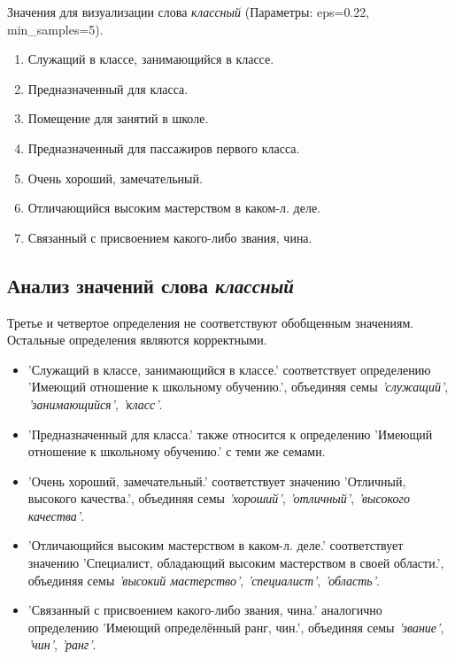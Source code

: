 Значения для визуализации слова \textit{классный} (Параметры: eps=0.22, min\_samples=5).

\begin{enumerate}
    \item Служащий в классе, занимающийся в классе.
    \item Предназначенный для класса.
    \item Помещение для занятий в школе.
    \item Предназначенный для пассажиров первого класса.
    \item Очень хороший, замечательный.
    \item Отличающийся высоким мастерством в каком-л. деле.
    \item Связанный с присвоением какого-либо звания, чина.
\end{enumerate}

\subsection*{Анализ значений слова \textit{классный}}

Третье и четвертое определения не соответствуют обобщенным значениям.
Остальные определения являются корректными.

\begin{itemize}
    \item ’Служащий в классе, занимающийся в классе.’ соответствует определению
’Имеющий отношение к школьному обучению.’, объединяя семы \textit{’служащий’}, \textit{’занимающийся’}, \textit{’класс’}.

    \item ’Предназначенный для класса.’ также относится к определению
’Имеющий отношение к школьному обучению.’ с теми же семами.

    \item ’Очень хороший, замечательный.’ соответствует значению ’Отличный, высокого качества.’,
объединяя семы \textit{’хороший’}, \textit{’отличный’}, \textit{’высокого качества’}.

    \item ’Отличающийся высоким мастерством в каком-л. деле.’ соответствует значению
’Специалист, обладающий высоким мастерством в своей области.’,
объединяя семы \textit{’высокий мастерство’}, \textit{’специалист’}, \textit{’область’}.

    \item ’Связанный с присвоением какого-либо звания, чина.’ аналогично определению
’Имеющий определённый ранг, чин.’, объединяя семы \textit{’звание’}, \textit{’чин’}, \textit{’ранг’}.
\end{itemize}

